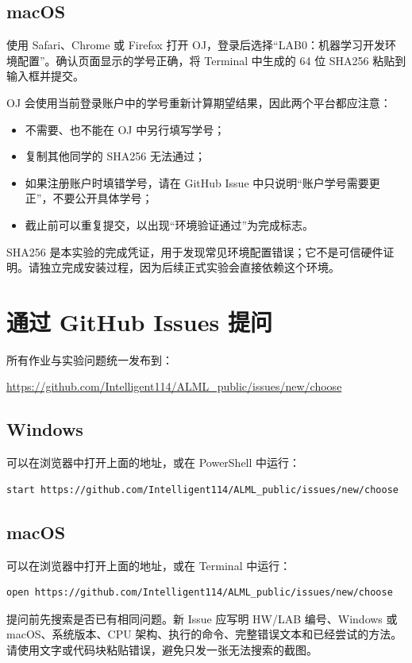 \documentclass[11pt,a4paper]{article}
\newcommand{\windows}{\subsection*{\textcolor{windowsblue}{Windows}}}
\newcommand{\macos}{\subsection*{\textcolor{macgray}{macOS}}}
\begin{document}
\macos

使用 Safari、Chrome 或 Firefox 打开 OJ，登录后选择“LAB0：机器学习开发环境配置”。确认页面显示的学号正确，将 Terminal 中生成的 64 位 SHA256 粘贴到输入框并提交。

OJ 会使用当前登录账户中的学号重新计算期望结果，因此两个平台都应注意：

\begin{itemize}
  \item 不需要、也不能在 OJ 中另行填写学号；
  \item 复制其他同学的 SHA256 无法通过；
  \item 如果注册账户时填错学号，请在 GitHub Issue 中只说明“账户学号需要更正”，不要公开具体学号；
  \item 截止前可以重复提交，以出现“环境验证通过”为完成标志。
\end{itemize}

\begin{importantbox}
SHA256 是本实验的完成凭证，用于发现常见环境配置错误；它不是可信硬件证明。请独立完成安装过程，因为后续正式实验会直接依赖这个环境。
\end{importantbox}

\section{通过 GitHub Issues 提问}

所有作业与实验问题统一发布到：
\begin{center}
  \url{https://github.com/Intelligent114/ALML_public/issues/new/choose}
\end{center}

\windows

可以在浏览器中打开上面的地址，或在 PowerShell 中运行：

\begin{lstlisting}[language=bash]
start https://github.com/Intelligent114/ALML_public/issues/new/choose
\end{lstlisting}

\macos

可以在浏览器中打开上面的地址，或在 Terminal 中运行：

\begin{lstlisting}[language=bash]
open https://github.com/Intelligent114/ALML_public/issues/new/choose
\end{lstlisting}

提问前先搜索是否已有相同问题。新 Issue 应写明 HW/LAB 编号、Windows 或 macOS、系统版本、CPU 架构、执行的命令、完整错误文本和已经尝试的方法。请使用文字或代码块粘贴错误，避免只发一张无法搜索的截图。
\end{document}
